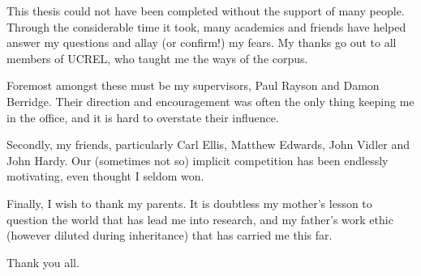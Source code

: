 
This thesis could not have been completed without the support of many people.  Through the considerable time it took, many academics and friends have helped answer my questions and allay (or confirm!) my fears.  My thanks go out to all members of UCREL, who taught me the ways of the corpus.

Foremost amongst these must be my supervisors, Paul Rayson and Damon Berridge.  Their direction and encouragement was often the only thing keeping me in the office, and it is hard to overstate their influence.

Secondly, my friends, particularly Carl Ellis, Matthew Edwards, John Vidler and John Hardy.  Our (sometimes not so) implicit competition has been endlessly motivating, even thought I seldom won.

Finally, I wish to thank my parents.  It is doubtless my mother's lesson to question the world that has lead me into research, and my father's work ethic (however diluted during inheritance) that has carried me this far.

\begin{center}
Thank you all.
\end{center}



